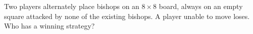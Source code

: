 Two players alternately place bishops on an $8\times8$ board, always on an empty square attacked by none of the existing bishops. A player unable to move loses. Who has a winning strategy?
